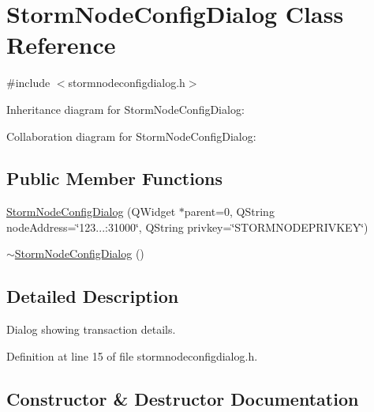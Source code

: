 \hypertarget{class_storm_node_config_dialog}{}\section{Storm\+Node\+Config\+Dialog Class Reference}
\label{class_storm_node_config_dialog}


{\ttfamily \#include $<$stormnodeconfigdialog.\+h$>$}



Inheritance diagram for Storm\+Node\+Config\+Dialog\+:


Collaboration diagram for Storm\+Node\+Config\+Dialog\+:
\subsection*{Public Member Functions}
\begin{DoxyCompactItemize}
\item 
\hyperlink{class_storm_node_config_dialog_a3b0f937188d6cc693a80fe1c9a90cf7e}{Storm\+Node\+Config\+Dialog} (Q\+Widget $\ast$parent=0, Q\+String node\+Address=\char`\"{}123...\+:31000\char`\"{}, Q\+String privkey=\char`\"{}S\+T\+O\+R\+M\+N\+O\+D\+E\+P\+R\+I\+V\+K\+E\+Y\char`\"{})
\item 
\hyperlink{class_storm_node_config_dialog_afd06075cb67f1a92bc6346d08f0b786f}{$\sim$\+Storm\+Node\+Config\+Dialog} ()
\end{DoxyCompactItemize}


\subsection{Detailed Description}
Dialog showing transaction details. 

Definition at line 15 of file stormnodeconfigdialog.\+h.



\subsection{Constructor \& Destructor Documentation}
\hypertarget{class_storm_node_config_dialog_a3b0f937188d6cc693a80fe1c9a90cf7e}{}

